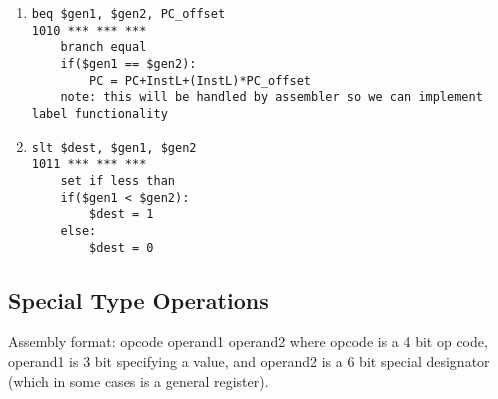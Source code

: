 \documentclass{article}
\begin{document}
\begin{enumerate}
\begin{verbatim}
\end{verbatim}
\item 
\begin{verbatim}
beq $gen1, $gen2, PC_offset
1010 *** *** ***
    branch equal
    if($gen1 == $gen2):
        PC = PC+InstL+(InstL)*PC_offset
    note: this will be handled by assembler so we can implement label functionality

\end{verbatim}
\item 
\begin{verbatim}
slt $dest, $gen1, $gen2
1011 *** *** ***
    set if less than
    if($gen1 < $gen2):
        $dest = 1
    else:
        $dest = 0
\end{verbatim}

\end{enumerate}

\subsection{Special Type Operations}
Assembly format: opcode operand1 operand2
where opcode is a 4 bit op code, operand1 is 3 bit specifying a value, and operand2 is a 6 bit special designator (which in some cases is a general register).
\end{document}
